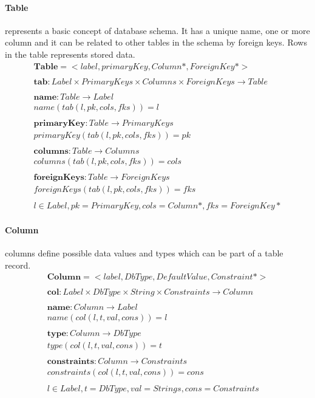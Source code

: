 \documentclass[11pt]{article}
\begin{document}
\paragraph{Table} represents a basic concept of database schema. It has a unique name, one or more column and it can be related to other tables in the schema by foreign keys. Rows in the table represents stored data.
\begin{align*}
	\mathbf{Table} = <label, primaryKey, Column*, ForeignKey*>\\ \\
	\mathbf{tab} 	: Label \times PrimaryKeys \times Columns \times ForeignKeys \rightarrow Table \\ \\
	\mathbf{name} : Table \rightarrow Label  \\
	name(tab(l, pk, cols, fks)) = l \\ \\
	\mathbf{primaryKey} : Table \rightarrow PrimaryKeys  \\
	primaryKey(tab(l, pk, cols, fks)) = pk \\ \\
	\mathbf{columns} : Table \rightarrow Columns  \\
	columns(tab(l, pk, cols, fks)) = cols \\ \\
	\mathbf{foreignKeys} : Table \rightarrow ForeignKeys  \\
	foreignKeys(tab(l, pk, cols, fks)) = fks \\ \\
l \in Label, pk = PrimaryKey, cols = Column*, fks = ForeignKey*
\end{align*}

\paragraph{Column} columns define possible data values and types which can be part of a table record.
\begin{align*}
	\mathbf{Column} = <label, DbType, DefaultValue, Constraint*> \\ \\
	\mathbf{col} : Label \times DbType \times String \times Constraints \rightarrow Column \\ \\
	\mathbf{name} : Column \rightarrow Label  \\
	name(col(l, t, val, cons)) = l  \\ \\
	\mathbf{type} : Column \rightarrow DbType  \\
	type(col(l, t, val, cons)) = t  \\ \\
	\mathbf{constraints} : Column \rightarrow Constraints  \\
	constraints(col(l, t, val, cons)) = cons  \\ \\
l \in Label, t = DbType, val = Strings, cons = Constraints
\end{align*}
\end{document}

